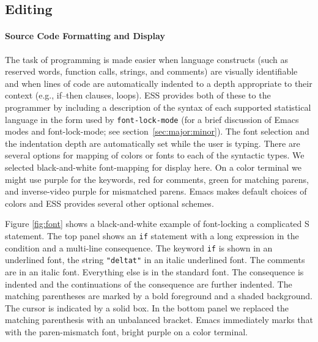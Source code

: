 \documentclass{article}
\newcommand{\stexttt}[1]{{\small\texttt{#1}}}
\begin{document}
\subsection{Editing}
\label{sec:ESS:features}

\paragraph{Source Code Formatting and Display}
The task of programming is made easier when language constructs (such
as reserved words, function calls, strings, and comments) are visually
identifiable and when lines of code are automatically indented to a
depth appropriate to their context (e.g., if--then clauses, loops).
ESS provides both of these to the programmer by including a
description of the syntax of each supported statistical language in
the form used by \stexttt{font-lock-mode} (for a brief discussion of 
Emacs modes and font-lock-mode; see section~\ref{sec:major:minor}).  
The font selection and the
indentation depth are automatically set while the user is typing.
There are several options for mapping of colors or fonts to each of
the syntactic types.  We selected black-and-white font-mapping for
display here.  On a color terminal we might use purple for the
keywords, red for comments, green for matching parens, and
inverse-video purple for mismatched parens.  Emacs makes default
choices of colors and ESS provides several other optional schemes.


Figure \ref{fig:font} shows a black-and-white example of font-locking a
complicated S statement.  The top panel shows an \stexttt{if}
statement with a long expression in the condition and a multi-line
consequence.  The keyword \stexttt{if} is shown in an underlined font,
the string \stexttt{"deltat"} in an italic underlined font.  The
comments are in an italic font.  Everything else is in the standard
font.  The consequence is indented and the continuations of the
consequence are further indented.  The matching parentheses are marked
by a bold foreground and a shaded background.  The cursor is indicated
by a solid box.  In the bottom panel we replaced the matching
parenthesis with an unbalanced bracket.  Emacs immediately marks that
with the paren-mismatch font, bright purple on a color terminal.
\end{document}
